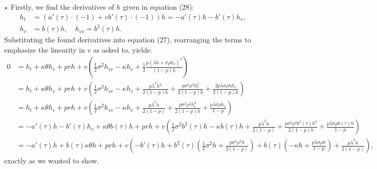 \documentclass[11pt]{article}
\numberwithin{equation}{section}
\begin{document}
\newpage
$\textcolor{blue}{\star}$ Firstly, we find the derivatives of $h$ given in
equation (28):
\begin{align*}
    h_t &= \left(a'(\tau) \cdot (-1) + vb'(\tau) \cdot (-1)\right)h = -a'(\tau)h - b'(\tau)h_v, \\
    h_v &= b(\tau)h,\quad h_{vv} = b^2(\tau)h.
\end{align*}
Substituting the found derivatives into equation (27), rearranging the terms to
emphasize the linearity in $v$ as asked to, yields:
\begin{align*}
    0 &= h_t + \kappa\theta h_v + prh + v \left( \frac{1}{2} \sigma^2 h_{vv} - \kappa h_v + \frac{1}{2}  \frac{p\left( \bar{\lambda}h + \sigma\rho h_v \right)^2}{(1-p)h} \right) \\
    &= h_t + \kappa\theta h_v + prh + v \left( \frac{1}{2} \sigma^2 h_{vv} - \kappa h_v + \frac{p\bar{\lambda}^2h^2}{2(1 - p)h} + \frac{p\sigma^2\rho^2h_v^2}{2(1 - p)h} + \frac{2p\bar{\lambda}\sigma\rho h h_v}{2(1 - p)h} \right) \\
    &= h_t + \kappa\theta h_v + prh + v \left( \frac{1}{2} \sigma^2 h_{vv} - \kappa h_v + \frac{p\bar{\lambda}^2 h}{2(1 - p)} + \frac{p\sigma^2\rho^2h_v^2}{2(1 - p)h} + \frac{p \bar{\lambda} \sigma\rho  h_v}{1 - p} \right) \\
    &= -a'(\tau)h - b'(\tau)h_v + \kappa\theta b(\tau)h + prh + v \left( \frac{1}{2} \sigma^2 b^2(\tau)h - \kappa b(\tau)h + \frac{p\bar{\lambda}^2h}{2(1 - p)}  + \frac{p\sigma^2\rho^2 b^2(\tau)h^2}{2(1 - p)h} + \frac{p\bar{\lambda}\sigma\rho b(\tau)h}{1 - p} \right) \\
    &= -a'(\tau)h + b(\tau)\kappa\theta h + prh + v \left( -b'(\tau)h + b^2(\tau) \left( \frac{1}{2}\sigma^2h + \frac{p\sigma^2\rho^2h}{2(1 - p)} \right)  + b(\tau) \left( -\kappa h + \frac{p \bar{\lambda}\sigma\rho h}{1 - p} \right) + \frac{p \bar{\lambda}^2 h}{2(1 - p)} \right),
    \end{align*}
exactly as we wanted to show.
\end{document}
